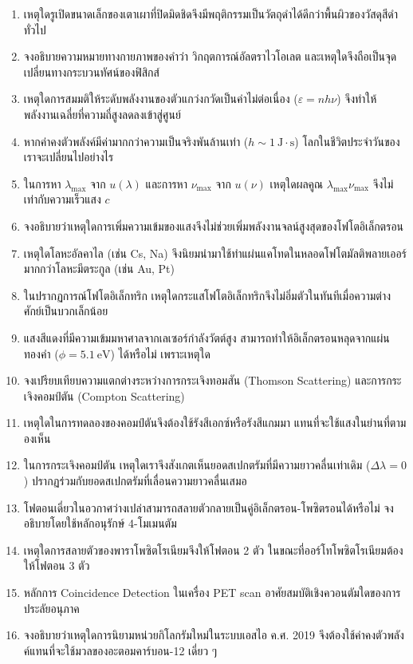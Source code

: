 \begin{enumerate}
    \item เหตุใดรูเปิดขนาดเล็กของเตาเผาที่ปิดมิดชิดจึงมีพฤติกรรมเป็นวัตถุดำได้ดีกว่าพื้นผิวของวัสดุสีดำทั่วไป
    \item จงอธิบายความหมายทางกายภาพของคำว่า วิกฤตการณ์อัลตราไวโอเลต และเหตุใดจึงถือเป็นจุดเปลี่ยนทางกระบวนทัศน์ของฟิสิกส์
    \item เหตุใดการสมมติให้ระดับพลังงานของตัวแกว่งกวัดเป็นค่าไม่ต่อเนื่อง ($\varepsilon = nh\nu$) จึงทำให้พลังงานเฉลี่ยที่ความถี่สูงลดลงเข้าสู่ศูนย์
    \item หากค่าคงตัวพลังค์มีค่ามากกว่าความเป็นจริงพันล้านเท่า ($h \sim 1~\text{J}\cdot\text{s}$) โลกในชีวิตประจำวันของเราจะเปลี่ยนไปอย่างไร
    \item ในการหา $\lambda_{\max}$ จาก $u(\lambda)$ และการหา $\nu_{\max}$ จาก $u(\nu)$ เหตุใดผลคูณ $\lambda_{\max}\nu_{\max}$ จึงไม่เท่ากับความเร็วแสง $c$
    \item จงอธิบายว่าเหตุใดการเพิ่มความเข้มของแสงจึงไม่ช่วยเพิ่มพลังงานจลน์สูงสุดของโฟโตอิเล็กตรอน
    \item เหตุใดโลหะอัลคาไล (เช่น Cs, Na) จึงนิยมนำมาใช้ทำแผ่นแคโทดในหลอดโฟโตมัลติพลายเออร์มากกว่าโลหะมีตระกูล (เช่น Au, Pt)
    \item ในปรากฏการณ์โฟโตอิเล็กทริก เหตุใดกระแสโฟโตอิเล็กทริกจึงไม่อิ่มตัวในทันทีเมื่อความต่างศักย์เป็นบวกเล็กน้อย
    \item แสงสีแดงที่มีความเข้มมหาศาลจากเลเซอร์กำลังวัตต์สูง สามารถทำให้อิเล็กตรอนหลุดจากแผ่นทองคำ ($\phi = 5.1~\text{eV}$) ได้หรือไม่ เพราะเหตุใด
    \item จงเปรียบเทียบความแตกต่างระหว่างการกระเจิงทอมสัน (Thomson Scattering) และการกระเจิงคอมป์ตัน (Compton Scattering)
    \item เหตุใดในการทดลองของคอมป์ตันจึงต้องใช้รังสีเอกซ์หรือรังสีแกมมา แทนที่จะใช้แสงในย่านที่ตามองเห็น
    \item ในการกระเจิงคอมป์ตัน เหตุใดเราจึงสังเกตเห็นยอดสเปกตรัมที่มีความยาวคลื่นเท่าเดิม ($\Delta\lambda = 0$) ปรากฏร่วมกับยอดสเปกตรัมที่เลื่อนความยาวคลื่นเสมอ
    \item โฟตอนเดี่ยวในอวกาศว่างเปล่าสามารถสลายตัวกลายเป็นคู่อิเล็กตรอน-โพซิตรอนได้หรือไม่ จงอธิบายโดยใช้หลักอนุรักษ์ 4-โมเมนตัม
    \item เหตุใดการสลายตัวของพาราโพซิตโรเนียมจึงให้โฟตอน 2 ตัว ในขณะที่ออร์โทโพซิตโรเนียมต้องให้โฟตอน 3 ตัว
    \item หลักการ Coincidence Detection ในเครื่อง PET scan อาศัยสมบัติเชิงควอนตัมใดของการประลัยอนุภาค
    \item จงอธิบายว่าเหตุใดการนิยามหน่วยกิโลกรัมใหม่ในระบบเอสไอ ค.ศ. 2019 จึงต้องใช้ค่าคงตัวพลังค์แทนที่จะใช้มวลของอะตอมคาร์บอน-12 เดี่ยว ๆ

\end{enumerate}
